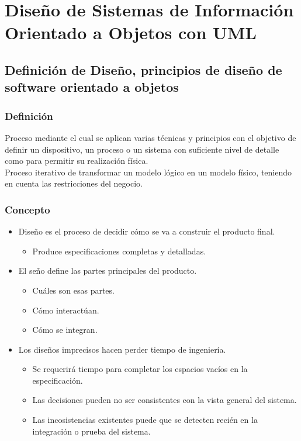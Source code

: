 \section{Diseño de Sistemas de Información Orientado a Objetos con UML}
\subsection{Definición de Diseño, principios de diseño de software orientado a objetos}
\subsubsection{Definición}
Proceso mediante el cual se aplican varias técnicas y principios con el objetivo de definir un dispositivo, un proceso o un sistema con suficiente nivel de detalle como para permitir su realización física.\\ 
Proceso iterativo de transformar un modelo lógico en un modelo físico, teniendo en cuenta las restricciones del negocio.\\
\subsubsection{Concepto}
\begin{itemize}
\item Diseño es el proceso de decidir cómo se va a construir el producto final.
\begin{itemize}
\item Produce especificaciones completas y detalladas.
\end{itemize}
\item El seño define las partes principales del producto.
\begin{itemize}
\item Cuáles son esas partes.
\item Cómo interactúan.
\item Cómo se integran.
\end{itemize}
\item Los diseños imprecisos hacen perder tiempo de ingeniería.
\begin{itemize}
\item Se requerirá tiempo para completar los espacios vacíos en la especificación.
\item Las decisiones pueden no ser consistentes con la vista general del sistema.
\item Las incosistencias existentes puede que se detecten recién en la integración o prueba del sistema.
\end{itemize}
\end{itemize}
\clearpage
